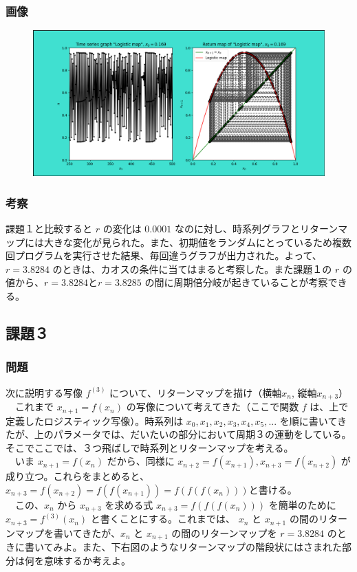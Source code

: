 \subsubsection{画像}
\begin{figure}[htbp]
  \centering
  \includegraphics[keepaspectratio, scale=0.5]{images/Problem7/tast7_2.png}
\end{figure}
\subsubsection{考察}
課題１と比較すると $r$ の変化は $0.0001$ なのに対し、時系列グラフとリターンマップには大きな変化が見られた。また、初期値をランダムにとっているため複数回プログラムを実行させた結果、毎回違うグラフが出力された。よって、$r = 3.8284$ のときは、カオスの条件に当てはまると考察した。また課題１の $r$ の値から、$r = 3.8284 と r = 3.8285$ の間に周期倍分岐が起きていることが考察できる。

\subsection{課題３}
\subsubsection{問題}
次に説明する写像 $f^{(3)}$ について、リターンマップを描け（横軸$x_n$, 縦軸$x_{n+3}$）\\
　これまで $x_{n+1} = f \left( x_n \right)$ の写像について考えてきた（ここで関数 $f$ は、上で定義したロジスティック写像）。時系列は $x_0, x_1, x_2, x_3, x_4, x_5, ...$ を順に書いてきたが、上のパラメータでは、だいたいの部分において周期３の運動をしている。そこでここでは、３つ飛ばしで時系列とリターンマップを考える。\\
　いま $x_{n+1} = f \left( x_n \right)$ だから、同様に $x_{n+2} = f \left( x_{n+1} \right), x_{n+3} = f \left( x_{n+2} \right)$ が成り立つ。これらをまとめると、$x_{n+3} = f \left( x_{n+2} \right) = f \left( f \left( x_{n+1} \right) \right) = f \left( f \left( f \left( x_n \right) \right) \right)$と書ける。\\
　この、$x_n$ から $x_{n+3}$ を求める式 $x_{n+3} = f \left( f \left( f \left( x_n \right) \right) \right)$ を簡単のために $x_{n+3} = f^{(3)}\left( x_n \right)$ と書くことにする。これまでは、 $x_n$ と $x_{n+1}$ の間のリターンマップを書いてきたが、$x_n$ と $x_{n+1}$ の間のリターンマップを $r = 3.8284$ のときに書いてみよ。また、下右図のようなリターンマップの階段状にはさまれた部分は何を意味するか考えよ。
